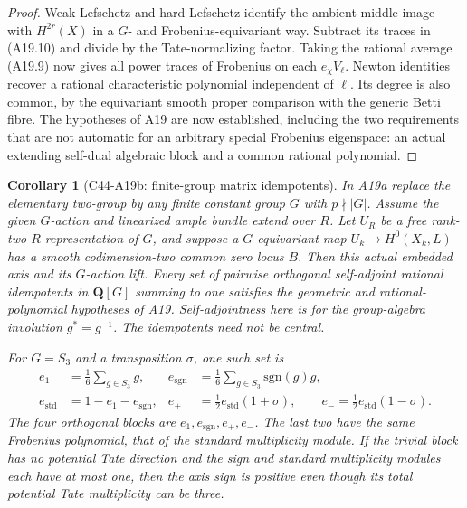 \documentclass[11pt]{article}
\newtheorem{corollary}[theorem]{Corollary}
\theoremstyle{remark}\newtheorem{remark}[theorem]{Remark}
\begin{document}
\begin{proof}
Weak Lefschetz and hard Lefschetz identify the ambient
middle image with $H^{2r}(X)$ in a $G$- and
Frobenius-equivariant way. Subtract its traces in
(A19.10) and divide by the Tate-normalizing factor.
Taking the rational average (A19.9) now gives all
power traces of Frobenius on each $e_\chi V_\ell$.
Newton identities recover a rational characteristic
polynomial independent of $\ell$. Its degree is also
common, by the equivariant smooth proper comparison
with the generic Betti fibre. The hypotheses of A19
are now established, including the two requirements
that are not automatic for an arbitrary special
Frobenius eigenspace: an actual extending self-dual
algebraic block and a common rational polynomial.
\end{proof}

\begin{corollary}[C44-A19b: finite-group matrix idempotents]
In A19a replace the elementary two-group by any finite
constant group $G$ with $p\nmid|G|$. Assume the given
$G$-action and linearized ample bundle extend over $R$.
Let $U_R$ be a free rank-two $R$-representation of $G$,
and suppose a $G$-equivariant map
$U_k\longrightarrow H^0(X_k,L)$ has a smooth
codimension-two common zero locus $B$.
Then this actual embedded axis and its $G$-action lift.
Every set of pairwise orthogonal self-adjoint rational
idempotents in $\mathbf Q[G]$ summing to one satisfies
the geometric and rational-polynomial hypotheses of A19.
Self-adjointness here is for the group-algebra involution
$g^*=g^{-1}$. The idempotents need not be central.

For $G=S_3$ and a transposition $\sigma$, one such set is
\[
 \begin{aligned}
 e_1&=\tfrac16\sum_{g\in S_3}g,&
 e_{\mathrm{sgn}}&=\tfrac16\sum_{g\in S_3}\mathrm{sgn}(g)g,\\
 e_{\mathrm{std}}&=1-e_1-e_{\mathrm{sgn}},&
 e_+&=\tfrac12e_{\mathrm{std}}(1+\sigma),\qquad
 e_- =\tfrac12e_{\mathrm{std}}(1-\sigma).
 \end{aligned}
 \tag{A19.11}
\]
The four orthogonal blocks are $e_1,e_{\mathrm{sgn}},e_+,e_-$.
The last two have the same Frobenius polynomial, that of
the standard multiplicity module. If the trivial block
has no potential Tate direction and the sign and standard
multiplicity modules each have at most one, then the
axis sign is positive even though its total potential
Tate multiplicity can be three.
\end{corollary}
\end{document}
